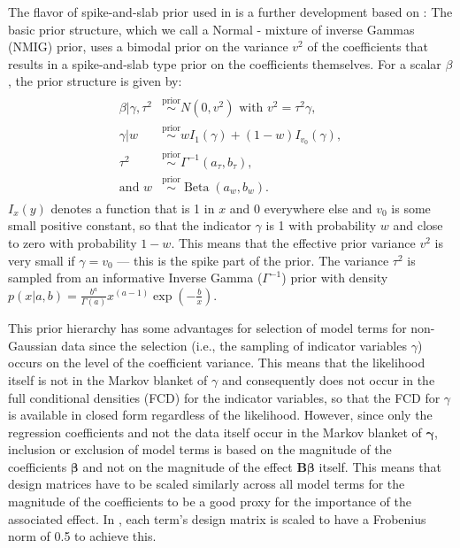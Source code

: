 \documentclass[article, shortnames, nojss, noheadings, notitle]{jss}
\newcommand{\priorsim}{\stackrel{\text{prior}}{\sim}}
\begin{document}
The flavor of spike-and-slab prior used in  is a further development based on \citet{Ishwaran:2005}:
The basic prior structure,
which we call a Normal - mixture of inverse Gammas (NMIG) prior, uses
a bimodal prior on the variance $v^2$ of the coefficients that results in a spike-and-slab type prior on
the coefficients themselves. For a scalar $\beta$, the prior structure is given by:
\begin{align}\label{F:basicNMIG}
\begin{split}
\beta|\gamma, \tau^2 &\priorsim N(0, v^2)\text{ with }v^2 = \tau^2\gamma,\\
\gamma|w &\priorsim w I_1(\gamma) + (1-w)I_{v_0}(\gamma), \\
\tau^2 &\priorsim \Gamma^{-1}(a_\tau, b_\tau), \\
\text{and } w &\priorsim \operatorname{Beta}(a_w, b_w).
\end{split}
\end{align}
$I_x(y)$ denotes a function that is 1 in $x$ and 0 everywhere else and $v_0$ is some small positive constant,
so that the indicator $\gamma$ is 1 with probability $w$ and close to zero with probability $1-w$.
This means that the effective prior variance $v^2$ is very small if $\gamma=v_0$
--- this is the spike part of the prior. The variance $\tau^2$ is sampled from an informative
Inverse Gamma ($\Gamma^{-1}$) prior with density $p(x| a, b) = \tfrac{b^a}{\Gamma(a)} x^{(a-1)} \exp\left(-\tfrac{b}{x}\right)$.

This prior hierarchy has some advantages for selection of model terms for non-Gaussian data
since the selection (i.e., the sampling of indicator variables
$\gamma$) occurs on the level of the coefficient variance. This means that the likelihood itself is not in the
Markov blanket of $\gamma$ and consequently does not occur in the
full conditional densities (FCD) for the indicator variables, so that the FCD for $\gamma$ is available in closed form
regardless of the likelihood. However,
since only the regression coefficients and not the data itself occur in the Markov blanket
of $\bm\gamma$, inclusion or exclusion of model terms is based on the magnitude of the coefficients $\bm \beta$ and
not on the magnitude
of the effect $\bm{B \beta}$ itself. This means that design matrices have to be scaled similarly
across all model terms for the magnitude of the coefficients to be a good proxy for the importance of the associated effect.
In , each term's design matrix is scaled to have a Frobenius norm of 0.5 to achieve this.
\end{document}
